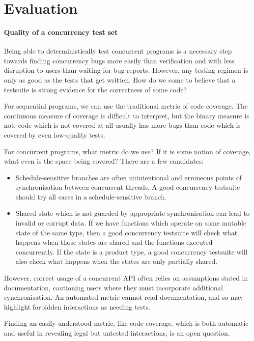 \blindtext

\section{Evaluation}
\label{sec:conclusions-evaluation}

\paragraph{Quality of a concurrency test set}
Being able to deterministically test concurrent programs is a
necessary step towards finding concurrency bugs more easily than
verification and with less disruption to users than waiting for bug
reports.  However, any testing regimen is only as good as the tests
that get written.  How do we come to believe that a testsuite is
strong evidence for the correctness of some code?

For sequential programs, we can use the traditional metric of code
coverage.  The continuous measure of coverage is difficult to
interpret, but the binary measure is not: code which is not covered at
all usually has more bugs than code which is covered by even
low-quality tests\cite{ahmed2016}.

For concurrent programs, what metric do we use?  If it is some notion
of coverage, what even is the space being covered?  There are a few
candidates:

\begin{itemize}
\item Schedule-sensitive branches are often unintentional and
  erroneous points of synchronisation between concurrent
  threads\cite{huang2015ssb}.  A good concurrency testsuite should try
  all cases in a schedule-sensitive branch.

\item Shared state which is not guarded by appropriate synchronisation
  can lead to invalid or corrupt data.  If we have functions which
  operate on some mutable state of the same type, then a good
  concurrency testsuite will check what happens when those states are
  shared and the functions executed concurrently.  If the state is a
  product type, a good concurrency testsuite will also check what
  happens when the states are only partially shared.
\end{itemize}

However, correct usage of a concurrent API often relies on assumptions
stated in documentation, cautioning users where they must incorporate
additional synchronisation.  An automated metric cannot read
documentation, and so may highlight forbidden interactions as needing
tests.

Finding an easily understood metric, like code coverage, which is both
automatic and useful in revealing legal but untested interactions, is
an open question.
